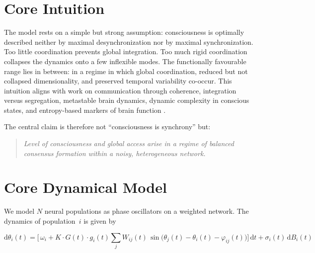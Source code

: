 \documentclass[11pt,a4paper]{article}
\theoremstyle{plain}
\theoremstyle{definition}
\theoremstyle{remark}
\begin{document}
\section{Core Intuition}
\label{sec:intuition}

The model rests on a simple but strong assumption: consciousness is optimally described neither by maximal desynchronization nor by maximal synchronization. Too little coordination prevents global integration. Too much rigid coordination collapses the dynamics onto a few inflexible modes. The functionally favourable range lies in between: in a regime in which global coordination, reduced but not collapsed dimensionality, and preserved temporal variability co-occur. This intuition aligns with work on communication through coherence, integration versus segregation, metastable brain dynamics, dynamic complexity in conscious states, and entropy-based markers of brain function \citep{fries2015,kelso2012,deco2017,demertzi2019,carhartharris2014,tagliazucchi2016}.

The central claim is therefore not ``consciousness is synchrony'' but:

\begin{quote}
\itshape
Level of consciousness and global access arise in a regime of balanced consensus formation within a noisy, heterogeneous network.
\end{quote}


\section{Core Dynamical Model}
\label{sec:core}
\label{sec:kernmodell}

We model $N$ neural populations as phase oscillators on a weighted network. The dynamics of population~$i$ is given by

\begin{equation}
\label{eq:dynamics}
\mathrm{d}\theta_i(t)
= \biggl[\,\omega_i
+ K \cdot G(t) \cdot g_i(t) \sum_{j} W_{ij}(t)\,\sin\!\bigl(\theta_j(t) - \theta_i(t) - \varphi_{ij}(t)\bigr)
\biggr]\,\mathrm{d}t
+ \sigma_i(t)\,\mathrm{d}B_i(t)
\end{equation}
\end{document}
